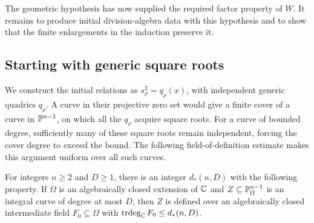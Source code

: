 The geometric hypothesis has now supplied the required factor property
of \(W\). It remains to produce initial division-algebra data with this
hypothesis and to show that the finite enlargements in the induction
preserve it.

\subsection{Starting with generic square roots}

We construct the initial relations as \(s_\rho^2=q_\rho(x)\), with
independent generic quadrics \(q_\rho\). A curve in their projective
zero set would give a finite cover of a curve in \(\mathbb P^{n-1}\), on
which all the \(q_\rho\) acquire square roots. For a curve of bounded
degree, sufficiently many of these square roots remain independent,
forcing the cover degree to exceed the bound. The following field-of-definition
estimate makes this argument uniform over all such curves.

\begin{lemma}\label{lem:bounded-curve-field}
For integers \(n\ge2\) and \(D\ge1\), there is an integer \(d_*(n,D)\)
with the following property. If \(\Omega\) is an algebraically closed
extension of \(\mathbb C\) and
\(Z\subseteq\mathbb P^{n-1}_\Omega\) is an integral curve of degree at most
\(D\), then \(Z\) is defined over an algebraically closed intermediate
field \(F_0\subseteq\Omega\) with
\(\operatorname{trdeg}_\mathbb C F_0\le d_*(n,D)\).
\end{lemma}

